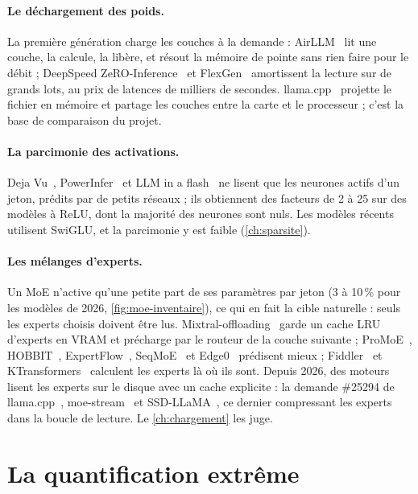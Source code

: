 \paragraph{Le déchargement des poids.} La première génération charge les couches à la demande : AirLLM~\cite{airllm2026} lit une couche, la calcule, la libère, et résout la mémoire de pointe sans rien faire pour le débit ; DeepSpeed ZeRO-Inference~\cite{zeroinference2022} et FlexGen~\cite{flexgen2023} amortissent la lecture sur de grands lots, au prix de latences de milliers de secondes. llama.cpp~\cite{llamacpp} projette le fichier en mémoire et partage les couches entre la carte et le processeur ; c'est la base de comparaison du projet.

\paragraph{La parcimonie des activations.} Deja Vu~\cite{dejavu2023}, PowerInfer~\cite{powerinfer2024,powerinfer2_2024} et LLM in a flash~\cite{llminflash2024} ne lisent que les neurones actifs d'un jeton, prédits par de petits réseaux ; ils obtiennent des facteurs de 2 à 25 sur des modèles à ReLU, dont la majorité des neurones sont nuls. Les modèles récents utilisent SwiGLU, et la parcimonie y est faible (\cref{ch:sparsite}).

\paragraph{Les mélanges d'experts.} Un MoE n'active qu'une petite part de ses paramètres par jeton (3 à 10\,\% pour les modèles de 2026, \cref{fig:moe-inventaire}), ce qui en fait la cible naturelle : seuls les experts choisis doivent être lus. Mixtral-offloading~\cite{mixtraloffload2023} garde un cache LRU d'experts en VRAM et précharge par le routeur de la couche suivante ; ProMoE~\cite{promoe2024}, HOBBIT~\cite{hobbit2024}, ExpertFlow~\cite{expertflow2024}, SeqMoE~\cite{seqmoe2026} et Edge0~\cite{edge0_2026} prédisent mieux ; Fiddler~\cite{fiddler2025} et KTransformers~\cite{ktransformers2025} calculent les experts là où ils sont. Depuis 2026, des moteurs lisent les experts sur le disque avec un cache explicite : la demande \#25294 de llama.cpp~\cite{llamapr25294}, moe-stream~\cite{moestream2026} et SSD-LLaMA~\cite{ssdllama2026}, ce dernier compressant les experts dans la boucle de lecture. Le \cref{ch:chargement} les juge.

\section{La quantification extrême}\label{sec:etat-quant}

